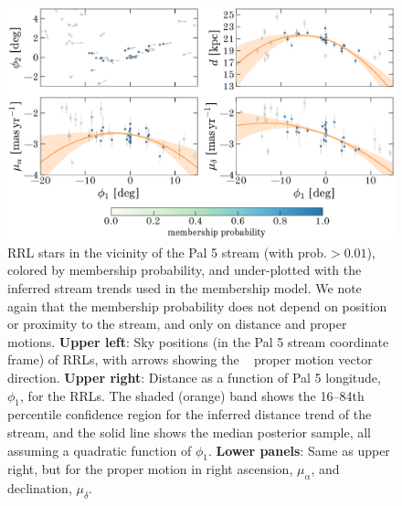 \documentclass[twocolumn]{aastex63}
\newcommand{\sa}[1]{{\color{teal} SP: #1}}
\begin{document}
\begin{figure}[t]
\begin{center}
\includegraphics[width=\textwidth]{tracks.pdf}
\caption{RRL stars in the vicinity of the Pal 5 stream (with $\textrm{prob.} > 0.01$), colored by membership probability, and under-plotted with the inferred stream trends used in the membership model.
We note again that the membership probability does not depend on position or proximity to the stream, and only on distance and proper motions.
\textbf{Upper left}: Sky positions (in the Pal 5 stream coordinate frame) of RRLs, with arrows showing the \Gaia\  proper motion vector direction.
\textbf{Upper right}: Distance as a function of Pal 5 longitude, $\phi_1$, for the RRLs. The shaded (orange) band shows the 16--84th percentile confidence region for the inferred distance trend of the stream, and the solid line shows the median posterior sample, all assuming a quadratic function of $\phi_1$.
\textbf{Lower panels}: Same as upper right, but for the proper motion in right ascension, $\mu_\alpha$, and declination, $\mu_\delta$.
}
\label{fig:trackmembers}
\end{center}
\end{figure}
\end{document}
